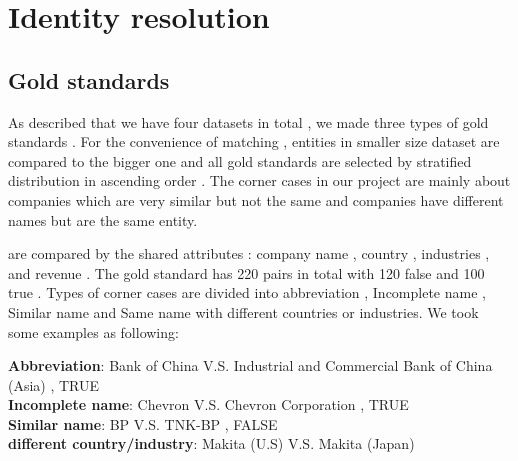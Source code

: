 \section{Identity resolution}
\subsection{Gold standards}
As described that we have four datasets in total , we made three types of gold standards . For the convenience of matching , entities in smaller size dataset are compared to the bigger one and all gold standards are selected by stratified distribution in ascending order . The corner cases in our project are mainly about companies which are very similar but not the same and companies have different names but are the same entity.

are compared by the shared attributes : company name , country , industries , and revenue . The gold standard has 220 pairs in total with 120 false and 100 true . Types of corner cases are divided into abbreviation , Incomplete name , Similar name and Same name with different countries or industries. We took some examples as following:

\textbf{Abbreviation}: Bank of China V.S. Industrial and Commercial Bank of China (Asia) , TRUE \\
\textbf{Incomplete name}: Chevron V.S. Chevron Corporation , TRUE  \\
\textbf{Similar name}: BP V.S. TNK-BP , FALSE \\
\textbf{different country/industry}: Makita (U.S) V.S. Makita (Japan) \\

